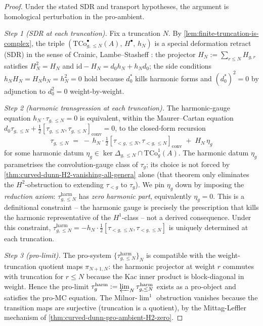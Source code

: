 \begin{proof}
Under the stated SDR and transport hypotheses, the argument is
homological perturbation in the pro-ambient.

\emph{Step 1 (SDR at each truncation).} Fix a truncation \(N\). By
\autoref{lem:finite-truncation-is-complex}, the triple
\((\mathrm{TCo}^{\bullet}_{g, \le N}(A),\, H^{\bullet},\, h_{N})\)
is a special deformation retract (SDR) in the sense of Crainic,
Lambe--Stasheff \cite{Crainic04, LS87}: the projector \(H_{N} :=
\sum_{r \le N} H_{g, r}\) satisfies \(H_{N}^{2} = H_{N}\) and
\(\mathrm{id} - H_{N} = d_{0} h_{N} + h_{N} d_{0}\); the side
conditions \(h_{N} H_{N} = H_{N} h_{N} = h_{N}^{2} = 0\) hold
because \(d_{0}^{\ast}\) kills harmonic forms and
\((d_{0}^{\ast})^{2} = 0\) by adjunction to \(d_{0}^{2} = 0\)
weight-by-weight.

\emph{Step 2 (harmonic transgression at each truncation).} The
harmonic-gauge equation \(h_{N} \cdot \tau_{g, \le N} = 0\) is
equivalent, within the Maurer--Cartan equation
\(d_{0}\tau_{g, \le N} + \tfrac{1}{2}[\tau_{g, \le N}, \tau_{g,
\le N}]_{\mathrm{conv}} = 0\), to the closed-form recursion
\[
 \tau_{g, \le N}
 \;=\;
 -\,h_{N}
 \cdot
 \tfrac{1}{2}[\tau_{<g, \le N}, \tau_{<g, \le N}]_{\mathrm{conv}}
 \;+\;
 H_{N}\,\eta_{g}
\]
for some harmonic datum
\(\eta_{g} \in \ker \Delta_{g, \le N} \cap \mathrm{TCo}^{1}_{g}(A)\).
The harmonic datum \(\eta_{g}\) parametrises the convolution-gauge
class of \(\tau_{g}\); its choice is not forced by
\autoref{thm:curved-dunn-H2-vanishing-all-genera} alone (that
theorem only eliminates the \(H^{2}\)-obstruction to extending
\(\tau_{<g}\) to \(\tau_{g}\)). We pin \(\eta_{g}\) down by
imposing the \emph{reduction axiom}: \(\tau_{g, \le N}^{\mathrm{harm}}\)
has \emph{zero harmonic part}, equivalently
\(\eta_{g} = 0\). This is a definitional constraint -- the harmonic
gauge is precisely the prescription that kills the harmonic
representative of the \(H^{1}\)-class -- not a derived
consequence. Under this constraint,
\(\tau_{g, \le N}^{\mathrm{harm}} = -h_{N}
\cdot \tfrac{1}{2}[\tau_{<g, \le N}, \tau_{<g, \le N}]\) is
uniquely determined at each truncation.

\emph{Step 3 (pro-limit).} The pro-system
\(\{\tau_{g, \le N}^{\mathrm{harm}}\}_{N}\) is compatible with the
weight-truncation quotient maps \(\pi_{N+1, N}\): the harmonic
projector at weight \(r\) commutes with truncation for \(r \le N\)
because the Kac inner product is block-diagonal in weight. Hence
the pro-limit
\(\tau_{g}^{\mathrm{harm}}
:= \varprojlim_{N} \tau_{g, \le N}^{\mathrm{harm}}\)
exists as a pro-object and satisfies the pro-MC equation. The
Milnor-\(\lim^{1}\) obstruction vanishes because the transition
maps are surjective (truncation is a quotient), by the
Mittag-Leffler mechanism of
\autoref{thm:curved-dunn-pro-ambient-H2-zero}.


\end{proof}
